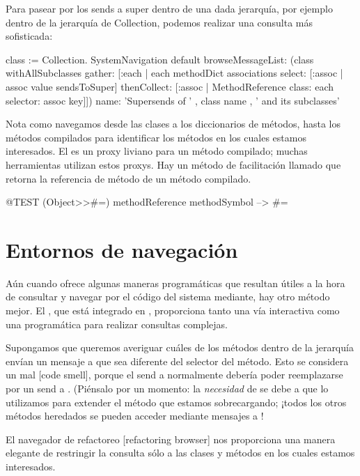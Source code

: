 \documentclass[a4paper,10pt,twoside]{book}
\begin{document}
Para pasear por los sends a super dentro de una dada jerarquía, por
ejemplo dentro de la jerarquía de Collection, podemos realizar una
consulta más sofisticada:
\begin{code}{}
class := Collection.
SystemNavigation default
  browseMessageList: (class withAllSubclasses gather: [:each |
    each methodDict associations
      select: [:assoc | assoc value sendsToSuper]
      thenCollect: [:assoc | MethodReference class: each selector: assoc key]])
  name: 'Supersends of ' , class name , ' and its subclasses'
\end{code}
Nota como navegamos desde las clases a los diccionarios de métodos,
hasta los métodos compilados para identificar los métodos en los
cuales estamos interesados.  El  es un proxy
liviano para un método compilado; muchas herramientas utilizan estos
proxys.  Hay un método de facilitación llamado
 que retorna la referencia
de método de un método compilado.
\begin{code}{@TEST}
(Object>>#=) methodReference methodSymbol --> #=
\end{code}

\section{Entornos de navegación}

Aún cuando  ofrece algunas maneras
programáticas que resultan útiles a la hora de consultar y navegar por
el código del sistema mediante, hay otro método mejor.  El
, que está integrado en \pharo, proporciona
tanto una vía interactiva como una programática para realizar
consultas complejas.

Supongamos que queremos averiguar cuáles de los métodos dentro de la
jerarquía envían un mensaje a \super que sea diferente
del selector del método.  Esto se considera un mal  [code smell], porque el send a \super normalmente debería
poder reemplazarse por un send a \self. (Piénsalo por un momento: la
\emph{necesidad} de \super se debe a que lo utilizamos para extender
el método que estamos sobrecargando; ¡todos los otros métodos
heredados se pueden acceder mediante mensajes a \self!

El navegador de refactoreo [refactoring browser] nos proporciona una
manera elegante de restringir la consulta sólo a las clases y métodos
en los cuales estamos interesados.
\end{document}
